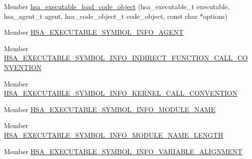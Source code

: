 \begin{DoxyRefList}
\item[Member \mbox{\hyperlink{group__code-object_gabf896a163cb3647a5172325221deb41b}{hsa\+\_\+executable\+\_\+load\+\_\+code\+\_\+object}} (hsa\+\_\+executable\+\_\+t executable, hsa\+\_\+agent\+\_\+t agent, hsa\+\_\+code\+\_\+object\+\_\+t code\+\_\+object, const char $\ast$options)]\label{deprecated__deprecated000052}%
%
 
\item[Member \mbox{\hyperlink{group__executable_gga27e2e3a930764e3e7385e1ceded09706a47f3db73bd7a19127a9827c976879fee}{HSA\+\_\+\+EXECUTABLE\+\_\+\+SYMBOL\+\_\+\+INFO\+\_\+\+AGENT}} ]\label{deprecated__deprecated000083}%
%
 
\item[Member \mbox{\hyperlink{group__executable_gga27e2e3a930764e3e7385e1ceded09706a1995d917f4839cd6a5e2dcb038d2e764}{HSA\+\_\+\+EXECUTABLE\+\_\+\+SYMBOL\+\_\+\+INFO\+\_\+\+INDIRECT\+\_\+\+FUNCTION\+\_\+\+CALL\+\_\+\+CONVENTION}} ]\label{deprecated__deprecated000090}%
%
 
\item[Member \mbox{\hyperlink{group__executable_gga27e2e3a930764e3e7385e1ceded09706ad838cd6a28a6d03a29473b0c910dcfc0}{HSA\+\_\+\+EXECUTABLE\+\_\+\+SYMBOL\+\_\+\+INFO\+\_\+\+KERNEL\+\_\+\+CALL\+\_\+\+CONVENTION}} ]\label{deprecated__deprecated000089}%
%
 
\item[Member \mbox{\hyperlink{group__executable_gga27e2e3a930764e3e7385e1ceded09706a0590dba27afbccac9dd8148bf3bf3d03}{HSA\+\_\+\+EXECUTABLE\+\_\+\+SYMBOL\+\_\+\+INFO\+\_\+\+MODULE\+\_\+\+NAME}} ]\label{deprecated__deprecated000082}%
%
 
\item[Member \mbox{\hyperlink{group__executable_gga27e2e3a930764e3e7385e1ceded09706a03bb272117f412f9a97f6f69a40193c3}{HSA\+\_\+\+EXECUTABLE\+\_\+\+SYMBOL\+\_\+\+INFO\+\_\+\+MODULE\+\_\+\+NAME\+\_\+\+LENGTH}} ]\label{deprecated__deprecated000081}%
%
 
\item[Member \mbox{\hyperlink{group__executable_gga27e2e3a930764e3e7385e1ceded09706a36a2ab0fe14663431a18ddc0334bd9a6}{HSA\+\_\+\+EXECUTABLE\+\_\+\+SYMBOL\+\_\+\+INFO\+\_\+\+VARIABLE\+\_\+\+ALIGNMENT}} ]\label{deprecated__deprecated000086}%
%
 

\end{DoxyRefList}
